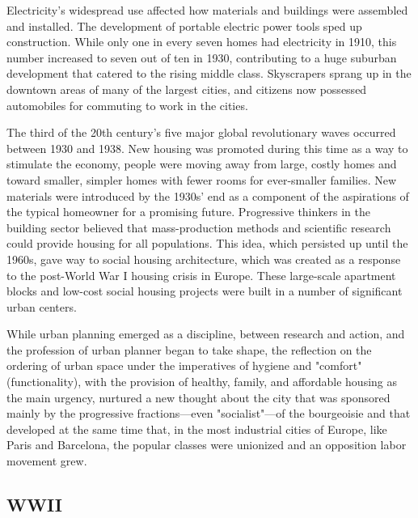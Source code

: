 Electricity's widespread use affected how materials and buildings were assembled and installed. The development of portable electric power tools sped up construction.\autocite{jester2014twentieth} While only one in every seven homes had electricity in 1910, this number increased to seven out of ten in 1930, contributing to a huge suburban development that catered to the rising middle class. Skyscrapers sprang up in the downtown areas of many of the largest cities, and citizens now possessed automobiles for commuting to work in the cities.\autocite{sharp2002twentieth}

The third of the 20th century's five major global revolutionary waves occurred between 1930 and 1938.\autocite{grinin202220th}  New housing was promoted during this time as a way to stimulate the economy,\autocite{agueda2016historia} people were moving away from large, costly homes and toward smaller, simpler homes with fewer rooms for ever-smaller families. New materials were introduced by the 1930s' end as a component of the aspirations of the typical homeowner for a promising future. Progressive thinkers in the building sector believed that mass-production methods and scientific research could provide housing for all populations.\autocite{jester2014twentieth} This idea, which persisted up until the 1960s, gave way to social housing architecture, which was created as a response to the post-World War I housing crisis in Europe. These large-scale apartment blocks and low-cost social housing projects were built in a number of significant urban centers.\autocite{sharp2002twentieth} 

While urban planning emerged as a discipline, between research and action, and the profession of urban planner\autocite{claude2006faire} began to take shape, the reflection on the ordering of urban space under the imperatives of hygiene and "comfort" (functionality), with the provision of healthy, family, and affordable housing as the main urgency, nurtured a new thought about the city that was sponsored mainly by the progressive fractions—even "socialist"—of the bourgeoisie and that developed at the same time that, in the most industrial cities of Europe, like Paris and Barcelona, the popular classes were unionized and an opposition labor movement grew.\autocite{agueda2016historia}

\subsection{WWII}
\label{sec:wwii}

